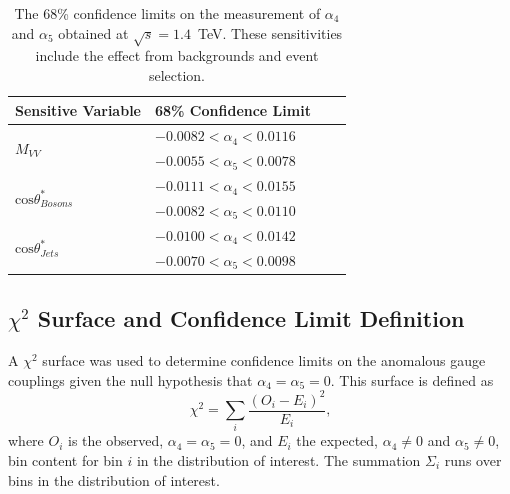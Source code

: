 \begin{table}[h!]
\centering
\begin{tabular}{l l l l}
\hline
Sensitive Variable & 68\% Confidence Limit \\
\hline
\multirow{ 2}{*}{$M_{VV}$} 					& $-0.0082 < \alpha_{4} < 0.0116$ \\
										& $-0.0055 < \alpha_{5} < 0.0078$ \\
\hline
\multirow{ 2}{*}{$\text{cos}\theta^{*}_{Bosons}$} 	& $-0.0111 < \alpha_{4} < 0.0155$ \\
										& $-0.0082 < \alpha_{5} < 0.0110$ \\
\hline
\multirow{ 2}{*}{$\text{cos}\theta^{*}_{Jets}$} 		& $-0.0100 < \alpha_{4} < 0.0142$ \\
										& $-0.0070 < \alpha_{5} < 0.0098$ \\
\end{tabular}
\caption[The 68\% confidence limits on the measurement of $\alpha_{4}$ and $\alpha_{5}$ obtained at $\sqrt{s} = 1.4$~TeV.  These sensitivities include the effect from backgrounds and event selection.]{The 68\% confidence limits on the measurement of $\alpha_{4}$ and $\alpha_{5}$ obtained at $\sqrt{s} = 1.4$~TeV.  These sensitivities include the effect from backgrounds and event selection.} 
\label{table:sensitivevariables}
\end{table}


\subsection{$\chi^{2}$ Surface and Confidence Limit Definition}
\label{sec:chi2surfacedefinition}
A $\chi^{2}$ surface was used to determine confidence limits on the anomalous gauge couplings given the null hypothesis that $\alpha_{4} = \alpha_{5} = 0$.  This surface is defined as  
%
\begin{equation}
\chi^{2} = \sum_{i} \frac{(O_{i} - E_{i})^{2}}{E_{i}} \text{,}
\end{equation}
%
\noindent where $O_{i}$ is the observed, $\alpha_{4} = \alpha_{5} = 0$, and $E_{i}$ the expected, $\alpha_{4} \neq 0$ and $\alpha_{5} \neq 0$, bin content for bin $i$ in the distribution of interest.  The summation $\Sigma_{i}$ runs over bins in the distribution of interest.  

